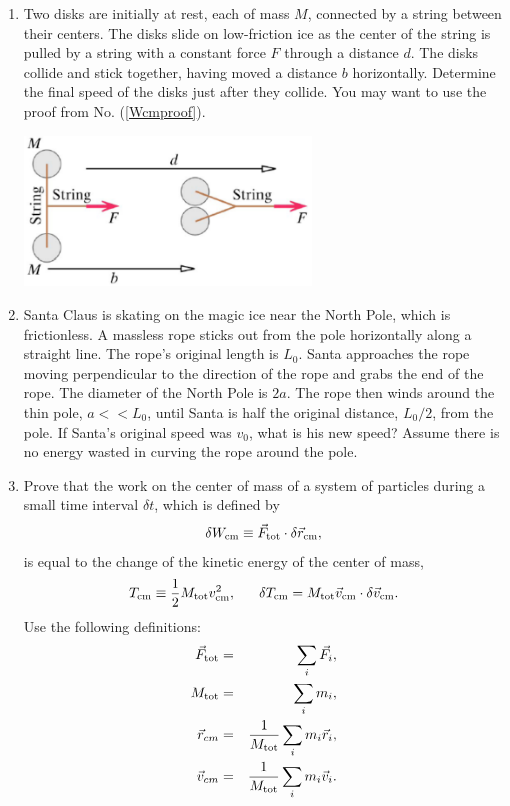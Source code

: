\begin{enumerate}
\item Two disks are initially at rest, each of mass $M$, connected by a string between their centers. The disks slide on low-friction ice as the center of the string is pulled by a string with a constant force $F$ through a distance $d$. The disks collide and stick together, having moved a distance $b$ horizontally. Determine the final speed of the disks just after they collide. You may want to use the proof from No. (\ref{Wcmproof}).

\includegraphics[width=0.6\textwidth]{figs/sliding_dumbells}

\item Santa Claus is skating on the magic ice near the North Pole, which is frictionless. A massless rope sticks out from the pole horizontally along a straight line. The rope's original length is $L_0$. Santa approaches the rope moving perpendicular to the direction of the rope and grabs the end of the rope. The diameter of the North Pole is $2a$. The rope then winds around the thin pole, $a<<L_0$, until Santa is half the original distance, $L_0/2$, from the pole. If Santa's original speed was $v_0$, what is his new speed? Assume there is no energy wasted in curving the rope around the pole. 

\item \label{Wcmproof}Prove that the work on the center of mass of a system of particles during a small time interval $\delta t$, which is defined by 
\[
\delta W_{\rm cm}\equiv \vec{F}_{\rm tot}\cdot \delta\vec{r}_{\rm cm},
\]
is equal to the change of the kinetic energy of the center of mass,
\[
T_{\rm cm}\equiv \frac{1}{2}M_{\rm tot}v_{\rm cm}^2, ~~~~~\delta T_{\rm cm}=M_{\rm tot}\vec{v}_{\rm cm}\cdot\delta\vec{v}_{\rm cm}.
\]
Use the following definitions:
\begin{eqnarray*}
\vec{F}_{\rm tot}&=&\sum_i \vec{F}_i,\\
M_{\rm tot}&=&\sum_i m_i,\\
\vec{r}_{cm}&=&\frac{1}{M_{\rm tot}}\sum_i m_i\vec{r}_i,\\
\vec{v}_{cm}&=&\frac{1}{M_{\rm tot}}\sum_i m_i\vec{v}_i.
\end{eqnarray*}

\end{enumerate} 

